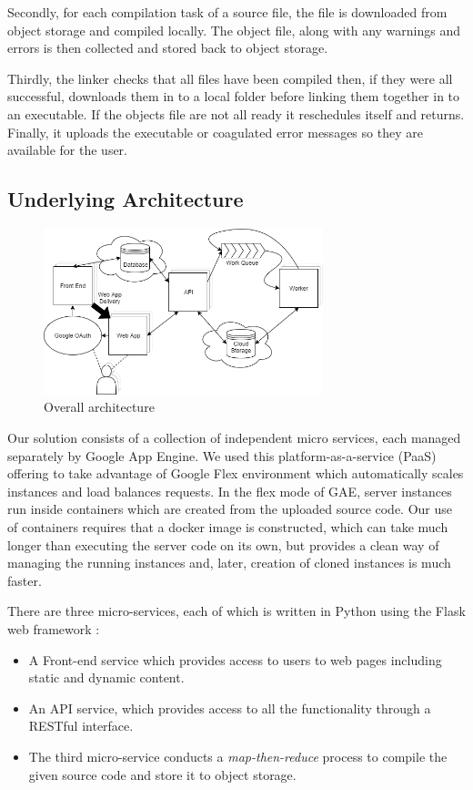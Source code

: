 \documentclass[conference]{IEEEtran}
\begin{document}
Secondly, for each compilation task of a source file, the file is downloaded
from object storage and compiled locally. The object file, along with any
warnings and errors is then collected and stored back to object storage.

Thirdly, the linker checks that all files have been compiled then, if they were
all successful, downloads them in to a local folder before linking them together
in to an executable. If the objects file are not all ready it reschedules
itself and returns. Finally, it uploads the executable or coagulated error
messages so they are available for the user.

\subsection{Underlying Architecture}
\begin{figure}[ht] %
    \centering
    \includegraphics[width=3.2in]{OverallArchitecture.png}
    \caption{Overall architecture}
    \label{fig:underlying}
\end{figure}

Our solution consists of a collection of independent micro services, each
managed separately by Google App Engine. We used this platform-as-a-service
(PaaS) offering to take advantage of Google Flex\cite{GAE} environment which
automatically scales instances and load balances requests. In the flex mode of GAE,
server instances run inside containers which are created from the uploaded
source code. Our use of containers requires that a docker image is constructed,
which can take much longer than executing the server code on its own, but provides a clean
way of managing the running instances and, later, creation of cloned instances
is much faster.

There are three micro-services, each of which is written in Python using the
Flask web framework \cite{Flask}:
\begin{itemize}
\item A Front-end service which provides access to users to web
pages including static and dynamic content.

\item An API service, which provides
access to all the functionality through a RESTful interface.

\item The third micro-service conducts a \emph{map-then-reduce} process to
compile the given source code and store it to object storage.
\end{itemize}
\end{document}
